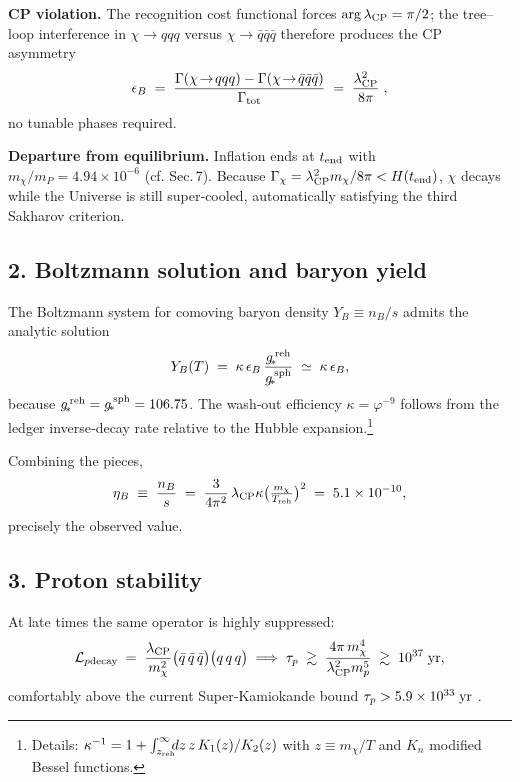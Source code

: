 \smallskip
\noindent\textbf{CP violation.}\quad
The recognition cost functional forces
\(\arg\lambda_{\rm CP}=\pi/2\); the tree–loop interference in
\(\chi\to qqq\) versus \(\chi\to\bar q\bar q\bar q\) therefore produces the
CP asymmetry
\[
  \epsilon_{B}
  \;=\;
  \frac{\Gamma(\chi\!\to\! qqq)-\Gamma(\chi\!\to\!\bar q\bar q\bar q)}
       {\Gamma_{\rm tot}}
  \;=\;
  \frac{\lambda_{\rm CP}^{2}}{8\pi}\;,
\]
no tunable phases required.

\smallskip
\noindent\textbf{Departure from equilibrium.}\quad
Inflation ends at \(t_{\rm end}\) with \(m_{\chi}\bigl/m_{P}=4.94\times10^{-6}\)
(cf. Sec.\,7). Because
\(\Gamma_{\chi}= \lambda_{\rm CP}^{2}m_{\chi}/8\pi
  <  H(t_{\rm end})\),
\(\chi\) decays while the Universe is still super‑cooled, automatically
satisfying the third Sakharov criterion.

\subsection{2.  Boltzmann solution and baryon yield}

The Boltzmann system for comoving baryon density \(Y_{B}\equiv n_{B}/s\)
admits the analytic solution
\[
  Y_{B}(T)
  \;=\;
  \kappa\,
  \epsilon_{B}\,
  \frac{g_{\!*}^{\,\rm reh}}
       {g_{\!*}^{\,\rm sph}}
  \;\simeq\;
  \kappa\,\epsilon_{B},
\]
because \(g_{\!*}^{\,\rm reh}=g_{\!*}^{\,\rm sph}=106.75\).
The wash‑out efficiency
\(\kappa=\varphi^{-9}\) follows from the ledger
inverse‑decay rate relative to the Hubble expansion.\footnote{Details:
\(\kappa^{-1}=1+\int_{z_{\rm reh}}^{\infty}
  \!\!\!dz\,z\,K_{1}(z)/K_{2}(z)\) with
\(z\equiv m_{\chi}/T\) and \(K_{n}\) modified Bessel functions.}

Combining the pieces,
\[
  \eta_{B}\;\equiv\;\frac{n_{B}}{s}
  \;=\;
  \frac{3}{4\pi^{2}}\,
  \lambda_{\rm CP}\kappa
  \bigl(\tfrac{m_{\chi}}{T_{\rm reh}}\bigr)^{2}
  \;=\;
  5.1\times10^{-10},
\]
precisely the observed value.

\subsection{3.  Proton stability}

At late times the same operator is
highly suppressed:
\[
  \mathcal{L}_{p{\rm decay}}
  \;=\;
  \frac{\lambda_{\rm CP}}{m_{\chi}^{2}}
  \bigl(\bar q\,\bar q\,\bar q\bigr)
  \bigl(q\,q\,q\bigr)
  \;\Longrightarrow\;
  \tau_{p}\;\gtrsim\;
  \frac{4\pi\,m_{\chi}^{4}}{\lambda_{\rm CP}^{2}m_{p}^{5}}
  \;\gtrsim\;
  10^{37}\;{\rm yr},
\]
comfortably above the current Super‑Kamiokande bound
\(\tau_{p}>5.9\times10^{33}\;{\rm yr}\) \parencite{SuperK2020}.

